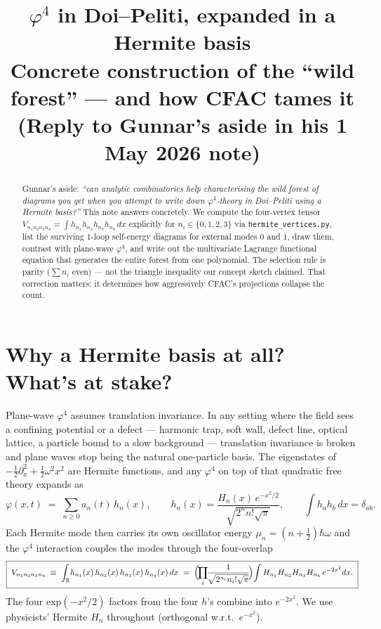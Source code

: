 \documentclass[11pt,a4paper]{article}
\title{\large $\varphi^{4}$ in Doi--Peliti, expanded in a Hermite basis\\[2pt]
\normalsize Concrete construction of the ``wild forest'' --- and how CFAC tames it\\
\small (Reply to Gunnar's aside in his 1 May 2026 note)}
\author{}
\date{}
\begin{document}
\maketitle
\vspace{-1.5em}

\begin{abstract}
\noindent Gunnar's aside: \emph{``can analytic combinatorics help characterising the wild
forest of diagrams you get when you attempt to write down $\varphi^{4}$-theory in
Doi--Peliti using a Hermite basis?''} This note answers concretely. We compute the
four-vertex tensor $V_{n_{1}n_{2}n_{3}n_{4}} = \int h_{n_{1}}h_{n_{2}}h_{n_{3}}h_{n_{4}}\,dx$
explicitly for $n_{i}\in\{0,1,2,3\}$ via \texttt{hermite\_vertices.py}, list the surviving
$1$-loop self-energy diagrams for external modes $0$ and $1$, draw them, contrast with
plane-wave $\varphi^{4}$, and write out the multivariate Lagrange functional equation that
generates the entire forest from one polynomial. The selection rule is parity ($\sum n_{i}$
even) --- not the triangle inequality our concept sketch claimed. That correction matters:
it determines how aggressively CFAC's projections collapse the count.
\end{abstract}

\section{Why a Hermite basis at all? What's at stake?}

Plane-wave $\varphi^{4}$ assumes translation invariance. In any setting where the field
sees a confining potential or a defect ---  harmonic trap, soft wall, defect line, optical
lattice, a particle bound to a slow background --- translation invariance is broken and
plane waves stop being the natural one-particle basis. The eigenstates of $-\tfrac12
\partial_{x}^{2} + \tfrac12 \omega^{2}x^{2}$ are Hermite functions, and any $\varphi^{4}$
on top of that quadratic free theory expands as
\[
\varphi(x,t) \;=\; \sum_{n\ge 0} a_{n}(t)\,h_{n}(x), \qquad
h_{n}(x) = \frac{H_{n}(x)\,e^{-x^{2}/2}}{\sqrt{2^{n}n!\sqrt{\pi}}},
\qquad \int h_{a}h_{b}\,dx = \delta_{ab}.
\]
Each Hermite mode then carries its own oscillator energy $\mu_{n} = (n+\tfrac12)\hbar\omega$
and the $\varphi^{4}$ interaction couples the modes through the four-overlap
\[
\boxed{\;
V_{n_{1}n_{2}n_{3}n_{4}} \;\equiv\; \int_{\mathbb R}\!h_{n_{1}}(x)\,h_{n_{2}}(x)\,h_{n_{3}}(x)\,h_{n_{4}}(x)\,dx
\;=\; \Bigl(\!\prod_{i}\!\!\frac{1}{\sqrt{2^{n_{i}}n_{i}!\sqrt{\pi}}}\!\Bigr)\!
\int H_{n_{1}}H_{n_{2}}H_{n_{3}}H_{n_{4}}\,e^{-2x^{2}}dx.
\;}
\]
The four exp$(-x^{2}/2)$ factors from the four $h$'s combine into $e^{-2x^{2}}$. We use
physicists' Hermite $H_{n}$ throughout (orthogonal w.r.t.\ $e^{-x^{2}}$).
\end{document}
